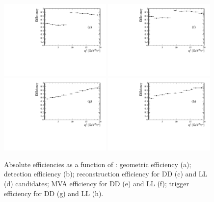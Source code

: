 \begin{figure}
\includegraphics[width=0.49\textwidth]{Lmumu/figs/efficiencies/BR/effvsq2_DD_mva.pdf}
\includegraphics[width=0.49\textwidth]{Lmumu/figs/efficiencies/BR/effvsq2_LL_mva.pdf}
\includegraphics[width=0.49\textwidth]{Lmumu/figs/efficiencies/BR/effvsq2_DD_trig.pdf}
\includegraphics[width=0.49\textwidth]{Lmumu/figs/efficiencies/BR/effvsq2_LL_trig.pdf}
\caption{Absolute efficiencies as a function of \qsq: geometric efficiency (a); 
detection efficiency (b); reconstruction efficiency for DD (c) and LL (d) candidates; 
MVA efficiency for DD (e) and LL (f); trigger efficiency for DD (g) and LL (h).}
\label{fig:Lb_absEff}
\end{figure}

\clearpage
